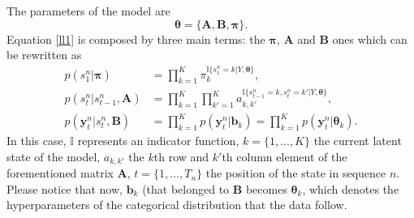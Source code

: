 \documentclass[12pt]{article}
\newcommand{\indicator}{\mathbb{I}}
\begin{document}
\noindent The parameters of the model are
\begin{equation}
\boldsymbol\theta = \{ \mathbf { A } , \mathbf { B } , \boldsymbol\pi \}.
\end{equation}
Equation \eqref{ll1} is composed by three main terms: the $\boldsymbol\pi$, $\mathbf { A }$ and $\mathbf { B } $ ones which can be rewritten as
\begin{align}
p \left( s _ { 1 } ^ { n } | \boldsymbol\pi \right) &= \prod\limits_{k=1}^{K}\pi_{k}^{\indicator \lbrace s_{1}^{n}=k|Y,\boldsymbol\theta\rbrace},\\
p \left( s _ { t } ^ { n } | s _ { t - 1 } ^ { n } , \mathbf { A } \right) &= \prod\limits_{k=1}^{K} \prod\limits_{k'=1}^{K}a_{k,k'}^{\indicator \lbrace s_{t-1}^{n}=k,s_{t}^{n}=k'|Y,\boldsymbol\theta\rbrace},\\
p \left( \mathbf { y } _ { t } ^ { n } | s _ { t } ^ { n } , \mathbf { B } \right) &= \prod\limits_{k=1}^{K} p \left( \mathbf { y } _ { t } ^ { n } | \boldsymbol b_{k} \right) = \prod\limits_{k=1}^{K} p \left( \mathbf { y } _ { t } ^ { n } | \boldsymbol\theta_{k} \right) \label{p3LL}.
\end{align}
In this case, $\indicator$ represents an indicator function, $k = \lbrace{1,...,K}\rbrace$ the current latent state of the model, $a_{k,k'}$ the $k$th row and $k'$th column element of the forementioned matrix $\mathbf { A }$, $t = \lbrace{1,...,T_{n}}\rbrace$ the position of the state in sequence $n$. Please notice that now, $\mathbf{b}_{k}$ (that belonged to $\mathbf{B}$ becomes $\boldsymbol\theta_{k}$, which denotes the hyperparameters of the categorical distribution that the data follow.\\
\end{document}
